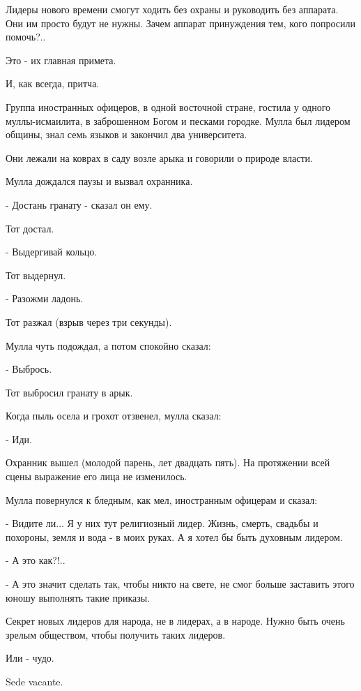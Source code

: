 Лидеры нового времени смогут ходить без охраны и руководить без аппарата. Они
им просто будут не нужны. Зачем аппарат принуждения тем, кого попросили
помочь?.. 

Это - их главная примета. 

И, как всегда, притча.

Группа иностранных офицеров, в одной восточной стране, гостила у одного
муллы-исмаилита, в заброшенном Богом и песками городке. Мулла был лидером
общины, знал семь языков и закончил два университета. 

Они лежали на коврах в саду возле арыка и говорили о природе власти.

Мулла дождался паузы и вызвал охранника. 

- Достань гранату - сказал он ему.

Тот достал.

- Выдергивай кольцо.

Тот выдернул.

- Разожми ладонь.

Тот разжал (взрыв через три секунды).

Мулла чуть подождал, а потом спокойно сказал: 

- Выбрось.

Тот выбросил гранату в арык.

Когда пыль осела и грохот отзвенел, мулла сказал:

- Иди. 

Охранник вышел (молодой парень, лет двадцать пять). На протяжении всей сцены
выражение его лица не изменилось. 

Мулла повернулся к бледным, как мел, иностранным офицерам и сказал:

- Видите ли... Я у них тут религиозный лидер. Жизнь, смерть, свадьбы и
похороны, земля и вода - в моих руках. А я хотел бы быть духовным лидером.

- А это как?!..

- А это значит сделать так, чтобы никто на свете, не смог больше заставить
этого юношу выполнять такие приказы. 

Секрет новых лидеров для народа, не в лидерах, а в народе. Нужно быть очень
зрелым обществом, чтобы получить таких лидеров. 

Или - чудо. 

Sede vacante.
